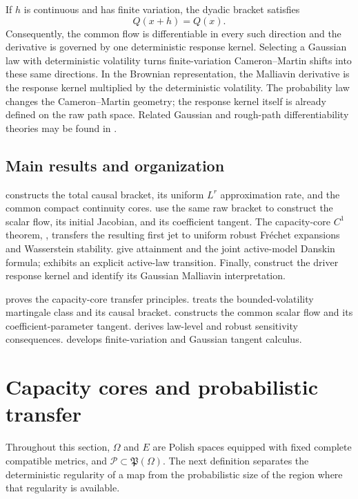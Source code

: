 \documentclass[11pt,reqno]{amsart}
\theoremstyle{plain}
\theoremstyle{definition}
\newcommand{\cP}{\mathcal P}
\begin{document}
If \(h\) is continuous and has finite variation, the dyadic bracket satisfies
\[
  Q(x+h)=Q(x).
\]
Consequently, the common flow is differentiable in every such direction and
the derivative is governed by one deterministic response kernel.  Selecting
a Gaussian law with deterministic volatility turns finite-variation
Cameron--Martin shifts into these same directions.  In the Brownian
representation, the Malliavin derivative is the response kernel multiplied
by the deterministic volatility.  The probability law changes the
Cameron--Martin geometry; the response kernel itself is already defined on
the raw path space.  Related Gaussian and rough-path differentiability
theories may be found in \cite{FrizVictoir10,Inahama14}.

\subsection{Main results and organization}

 constructs the total causal bracket, its uniform
\(L^r\) approximation rate, and the common compact continuity cores.
 use the same raw bracket to
construct the scalar flow, its initial Jacobian, and its coefficient tangent.
The capacity-core \(C^1\) theorem, , transfers the
resulting first jet to uniform robust Fr\'echet expansions and Wasserstein
stability.  
give attainment and the joint active-model Danskin formula;
 exhibits an explicit active-law transition.
Finally,
 construct the driver
response kernel and identify its Gaussian Malliavin interpretation.

 proves the capacity-core transfer principles.
 treats the bounded-volatility martingale class and its
causal bracket.   constructs the common scalar flow and its
coefficient-parameter tangent.
 derives law-level and robust sensitivity
consequences.   develops finite-variation and Gaussian
tangent calculus.

\section{Capacity cores and probabilistic transfer}
\label{sec:cores}

Throughout this section, \(\Omega\) and \(E\) are Polish spaces equipped
with fixed complete compatible metrics, and
\(\cP\subset\mathfrak P(\Omega)\).  The next definition separates the
deterministic regularity of a map from the probabilistic size of the region
where that regularity is available.
\end{document}
